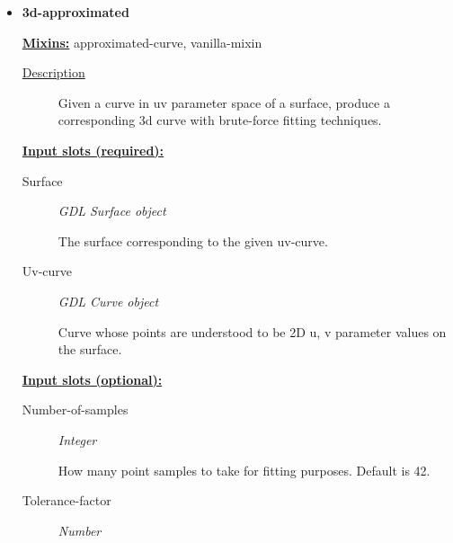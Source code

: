 \documentclass [11pt]{book}
\begin{document}
\begin{itemize}

\item {}
\label{prim:3d-approximated}
\textbf{3d-approximated}


\textbf{
\underline{Mixins:}} approximated-curve, vanilla-mixin





\begin{description}

\item [
\underline{Description}]


Given a curve in uv parameter space of
  a surface, produce a corresponding 3d curve with brute-force fitting
  techniques.



\end{description}








\textbf{
\underline{Input slots (required):}}

\begin{description}

\item [Surface]
\emph{GDL Surface object}

 The surface corresponding to the given uv-curve.




\item [Uv-curve]
\emph{GDL Curve object}

 Curve whose points are understood to be 2D u, v
parameter values on the surface.




\end{description}






\textbf{
\underline{Input slots (optional):}}

\begin{description}

\item [Number-of-samples]
\emph{Integer}

 How many point samples to take for fitting
purposes. Default is 42.




\item [Tolerance-factor]
\emph{Number}


\end{description}
\end{itemize}
\end{document}

